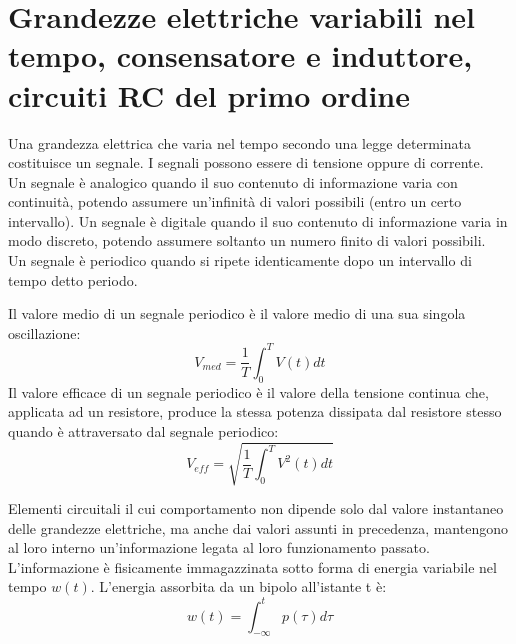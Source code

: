 \section{Grandezze elettriche variabili nel tempo, consensatore e induttore, circuiti RC del primo ordine}

\begin{defn}[Segnale]
    Una grandezza elettrica che varia nel tempo secondo una legge determinata costituisce un segnale. 
    I segnali possono essere di tensione oppure di corrente. \\
    Un segnale è analogico quando il suo contenuto di informazione varia con
    continuità, potendo assumere un'infinità di valori possibili (entro un certo intervallo).
    Un segnale è digitale quando il suo contenuto di informazione varia in modo discreto, 
    potendo assumere soltanto un numero finito di valori possibili. \\
    Un segnale è periodico quando si ripete identicamente dopo un intervallo di tempo detto periodo.
\end{defn}

\begin{defn}
    Il valore medio di un segnale periodico è il valore medio di una sua singola oscillazione: 
    $$V_{med} = \frac{1}{T} \int_{0}^{T} V(t) dt$$
    Il valore efficace di un segnale periodico è il valore della tensione continua che, applicata ad un resistore, 
    produce la stessa potenza dissipata dal resistore stesso quando è attraversato dal segnale periodico: 
    $$V_{eff} = \sqrt{\frac{1}{T} \int_{0}^{T} V^2(t) dt}$$
\end{defn}

\begin{defn}
    Elementi circuitali il cui comportamento non dipende solo dal valore instantaneo delle grandezze elettriche, 
    ma anche dai valori assunti in precedenza, mantengono al loro interno un'informazione legata al loro funzionamento passato.
    L'informazione è fisicamente immagazzinata sotto forma di energia variabile nel tempo $w(t)$. 
    L'energia assorbita da un bipolo all'istante t è: $$w(t) = \int_{-\infty}^{t} p(\tau) d\tau$$
\end{defn}

